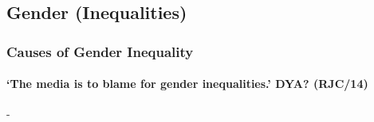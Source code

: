 \documentclass[../../main]{subfiles}
\begin{document}
\subsection{Gender (Inequalities)}

\subsubsection{Causes of Gender Inequality}

\paragraph{`The media is to blame for gender inequalities.' DYA? (RJC/14)}-
\end{document}
